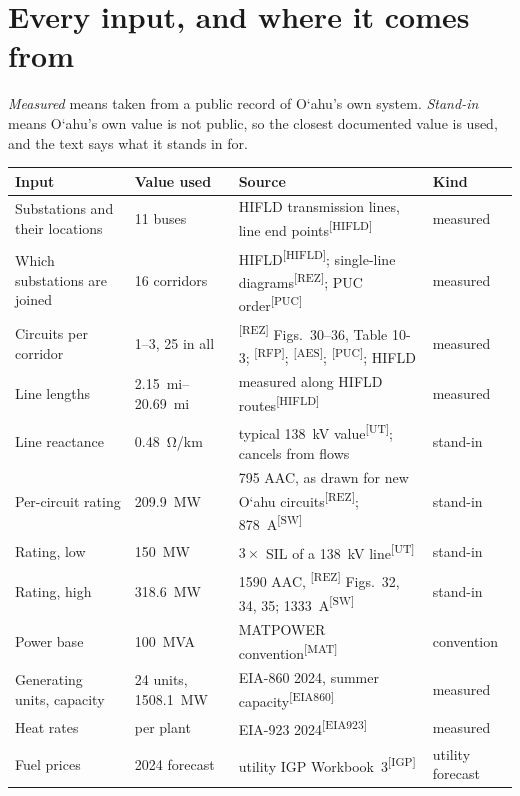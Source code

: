 \documentclass[11pt,a4paper]{article}
\newcommand{\okina}{\textquoteleft}
\newcommand{\Oahu}{O\okina ahu}
\newcommand{\src}[1]{\textsuperscript{[#1]}}
\begin{document}
\appendix
\section{Every input, and where it comes from}
\label{app:sources}

\emph{Measured} means taken from a public record of \Oahu's own system.
\emph{Stand-in} means \Oahu's own value is not public, so the closest documented value
is used, and the text says what it stands in for.

\begin{small}
\begin{longtable}{@{}p{}p{}p{}p{}@{}}
\toprule
\textbf{Input} & \textbf{Value used} & \textbf{Source} & \textbf{Kind} \\
\midrule
\endhead
Substations and their locations & 11 buses & HIFLD transmission lines, line end points\src{HIFLD} & measured \\
Which substations are joined & 16 corridors & HIFLD\src{HIFLD}; single-line diagrams\src{REZ}; PUC order\src{PUC} & measured \\
Circuits per corridor & 1--3, 25 in all & \src{REZ} Figs.~30--36, Table 10-3; \src{RFP}; \src{AES}; \src{PUC}; HIFLD & measured \\
Line lengths & \SIrange{2.15}{20.69}{mi} & measured along HIFLD routes\src{HIFLD} & measured \\
Line reactance & \SI{0.48}{\ohm/km} & typical \SI{138}{kV} value\src{UT}; cancels from flows & stand-in \\
Per-circuit rating & \SI{209.9}{MW} & 795 AAC, as drawn for new \Oahu{} circuits\src{REZ}; \SI{878}{A}\src{SW} & stand-in \\
Rating, low & \SI{150}{MW} & $3\times$ SIL of a \SI{138}{kV} line\src{UT} & stand-in \\
Rating, high & \SI{318.6}{MW} & 1590 AAC, \src{REZ} Figs.~32, 34, 35; \SI{1333}{A}\src{SW} & stand-in \\
Power base & \SI{100}{MVA} & MATPOWER convention\src{MAT} & convention \\
Generating units, capacity & 24 units, \SI{1508.1}{MW} & EIA-860 2024, summer capacity\src{EIA860} & measured \\
Heat rates & per plant & EIA-923 2024\src{EIA923} & measured \\
Fuel prices & 2024 forecast & utility IGP Workbook~3\src{IGP} & utility forecast \\

\end{longtable}
\end{small}
\end{document}
